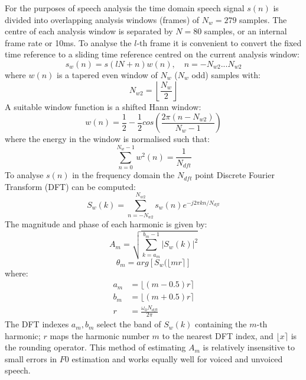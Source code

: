\documentclass{article}
\begin{document}
For the purposes of speech analysis the time domain speech signal $s(n)$ is divided into overlapping analysis windows (frames) of $N_w=279$ samples. The centre of each analysis window is separated by $N=80$ samples, or an internal frame rate or 10ms. To analyse the $l$-th frame it is convenient to convert the fixed time reference to a sliding time reference centred on the current analysis window:
\begin{equation}
s_w(n) = s(lN + n) w(n), \quad n = - N_{w2} ... N_{w2}
\end{equation}
where $w(n)$ is a tapered even window of $N_w$ ($N_w$ odd) samples with:
\begin{equation}
N_{w2} = \left \lfloor \frac{N_w}{2} \right \rfloor
\end{equation}
A suitable window function is a shifted Hann window:
\begin{equation}
w(n) = \frac{1}{2} - \frac{1}{2} cos \left(\frac{2 \pi (n- N_{w2})}{N_w-1} \right)
\end{equation}
where the energy in the window is normalised such that:
\begin{equation}
\sum_{n=0}^{N_w-1}w^2(n) = \frac{1}{N_{dft}}
\end{equation}
To analyse $s(n)$ in the frequency domain the $N_{dft}$ point Discrete Fourier Transform (DFT) can be computed:
\begin{equation}
S_w(k) = \sum_{n=-N_{w2}}^{N_{w2}} s_w(n) e^{-j 2 \pi k n / N_{dft}}
\end{equation}
The magnitude and phase of each harmonic is given by:
\begin{equation}
\label{eq:mag_est}
A_m = \sqrt{\sum_{k=a_m}^{b_m-1} |S_w(k)|^2 }
\end{equation}
\begin{equation}
\theta_m = arg \left[ S_w(\lfloor m r \rceil \right]
\end{equation}
where:
\begin{equation}
\begin{split}
a_m      &= \lfloor (m - 0.5)r \rceil \\
b_m      &= \lfloor (m + 0.5)r \rceil \\
r        &= \frac{\omega_0 N_{dft}}{2 \pi} 
\end{split}
\end{equation}
The DFT indexes $a_m, b_m$ select the band of $S_w(k)$ containing the $m$-th harmonic; $r$ maps the harmonic number $m$ to the nearest DFT index, and $\lfloor x \rceil$ is the rounding operator. This method of estimating $A_m$ is relatively insensitive to small errors in $F0$ estimation and works equally well for voiced and unvoiced speech.
\end{document}
